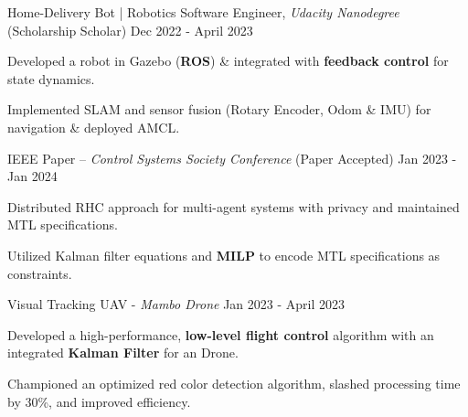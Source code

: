 



\begin{cventries}


  \cventry
    {Home-Delivery Bot \textnormal{ | Robotics Software Engineer, \textit{Udacity Nanodegree} (Scholarship Scholar)}} %
    {Dec 2022 - April 2023} %
    {
      \begin{cvitems} %
        \item {Developed a robot in Gazebo ({\bf ROS}) \& integrated with {\bf feedback control} for state dynamics.}
        \item {Implemented SLAM and sensor fusion (Rotary Encoder, Odom \& IMU) for navigation \& deployed AMCL.}
      \end{cvitems}
    }
    

  \cventry
    {IEEE Paper \textnormal{-- \textit{Control Systems Society Conference} (Paper Accepted)}} %
    {Jan 2023 - Jan 2024} %
    {
      \begin{cvitems} %
        \item {Distributed RHC approach for multi-agent systems with privacy and maintained MTL specifications.}
        \item{Utilized Kalman filter equations and {\bf MILP} to encode MTL specifications as constraints.}
      \end{cvitems}
    }


  \cventry
    {Visual Tracking UAV \textnormal{ - \textit{Mambo Drone}}} %
    { Jan 2023 - April 2023} %
    {
      \begin{cvitems} %
        \item {Developed a high-performance, {\bf low-level flight control} algorithm with an integrated {\bf Kalman Filter} for an Drone.}
        \item {Championed an optimized red color detection algorithm, slashed processing time by 30\%, and improved efficiency.}
      \end{cvitems}
    }


\end{cventries}
